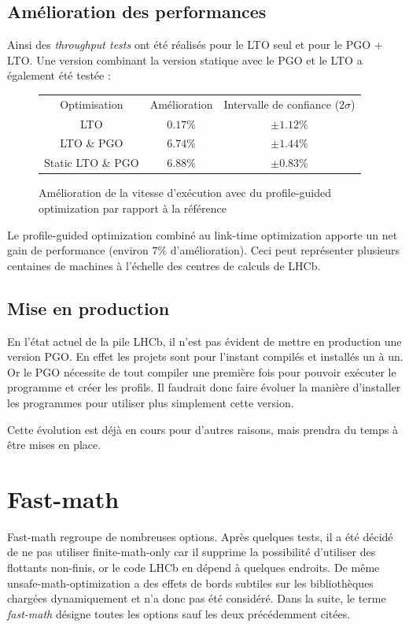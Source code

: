 \documentclass[a4paper,11pt]{report}
\begin{document}
\subsection{Amélioration des performances}
Ainsi des \emph{throughput tests} ont été réalisés pour le LTO seul et pour le PGO + LTO.
Une version combinant la version statique avec le PGO et le LTO a également été testée :
\begin{figure}[H]
    \begin{center}
        \begin{tabular}{ c c c }
            Optimisation      & Amélioration & Intervalle de confiance ($2\sigma$) \\
            LTO               & $0.17\%$     & $\pm 1.12\%$                        \\
            LTO \& PGO        & $6.74\%$     & $\pm 1.44\%$                        \\
            Static LTO \& PGO & $6.88\%$     & $\pm 0.83\%$
        \end{tabular}
    \end{center}
    \caption{Amélioration de la vitesse d'exécution avec du profile-guided optimization par rapport à la référence}
    \label{results_pgo}
\end{figure}

Le profile-guided optimization combiné au link-time optimization apporte un net gain de performance (environ $7\%$ d'amélioration).
Ceci peut représenter plusieurs centaines de machines à l'échelle des centres de calculs de LHCb.

\subsection{Mise en production}
En l'état actuel de la pile LHCb, il n'est pas évident de mettre en production une version PGO.
En effet les projets sont pour l'instant compilés et installés un à un.
Or le PGO nécessite de tout compiler une première fois pour pouvoir exécuter le programme et créer les profils.
Il faudrait donc faire évoluer la manière d'installer les programmes pour utiliser plus simplement cette version.

Cette évolution est déjà en cours pour d'autres raisons, mais prendra du temps à être mises en place.

\section{Fast-math}
Fast-math regroupe de nombreuses options.
Après quelques tests, il a été décidé de ne pas utiliser finite-math-only car il supprime la possibilité d'utiliser des flottants non-finis, or le code LHCb en dépend à quelques endroits.
De même unsafe-math-optimization a des effets de bords subtiles sur les bibliothèques chargées dynamiquement et n'a donc pas été considéré.
Dans la suite, le terme \emph{fast-math} désigne toutes les options sauf les deux précédemment citées.
\end{document}
